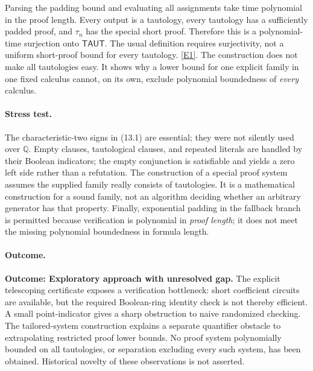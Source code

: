 \documentclass[11pt,a4paper]{article}
\newcommand{\Q}{\mathbb{Q}}
\newcommand{\eref}[2]{\hyperlink{extra:#1:#2}{[E#2]}}
\begin{document}
Parsing the padding bound and evaluating all assignments take time
polynomial in the proof length. Every output is a tautology, every
tautology has a sufficiently padded proof, and $\tau_n$ has the special
short proof. Therefore this is a polynomial-time surjection onto
$\mathsf{TAUT}$. The usual definition requires surjectivity, not a
uniform short-proof bound for every tautology. \eref{30006679}{1}.
The construction does not make all tautologies easy. It shows why a
lower bound for one explicit family in one fixed calculus cannot, on
its own, exclude polynomial boundedness of \emph{every} calculus.

\paragraph{Stress test.}
The characteristic-two signs in (13.1) are essential; they were not
silently used over $\Q$. Empty clauses, tautological clauses, and repeated
literals are handled by their Boolean indicators; the empty conjunction
is satisfiable and yields a zero left side rather than a refutation.
The construction of a special proof system assumes the supplied family
really consists of tautologies. It is a mathematical construction for a
sound family, not an algorithm deciding whether an arbitrary generator
has that property. Finally, exponential padding in the fallback branch
is permitted because verification is polynomial in \emph{proof length};
it does not meet the missing polynomial boundedness in formula length.

\paragraph{Outcome.}
\textbf{Outcome: Exploratory approach with unresolved gap.}
The explicit telescoping certificate exposes a verification bottleneck:
short coefficient circuits are available, but the required Boolean-ring
identity check is not thereby efficient. A small point-indicator gives a
sharp obstruction to naive randomized checking. The tailored-system
construction explains a separate quantifier obstacle to extrapolating
restricted proof lower bounds. No proof system polynomially bounded on
all tautologies, or separation excluding every such system, has been
obtained. Historical novelty of these observations is not asserted.
\end{document}
